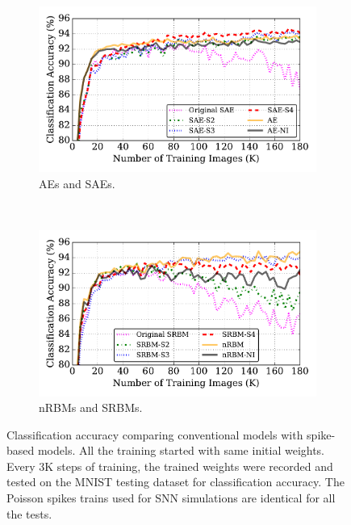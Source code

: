 \begin{figure}
	\centering
	\begin{subfigure}[t]{0.8\textwidth}
		\includegraphics[width=\textwidth]{pics_sdlm/43_MNIST_SAE_all/compare_result.pdf}
		\caption{AEs and SAEs.}
	\end{subfigure}\\
	\begin{subfigure}[t]{0.8\textwidth}
		\includegraphics[width=\textwidth]{pics_sdlm/53_MNIST_SRBM_all/compare_result.pdf}
		\caption{nRBMs and SRBMs.}
	\end{subfigure}
	\caption{Classification accuracy comparing conventional models with spike-based models. All the training started with same initial weights. Every 3K steps of training, the trained weights were recorded and tested on the MNIST testing dataset for classification accuracy. The Poisson spikes trains used for SNN simulations are identical for all the tests.}
	\label{fig:sdlm_ca}
\end{figure}
